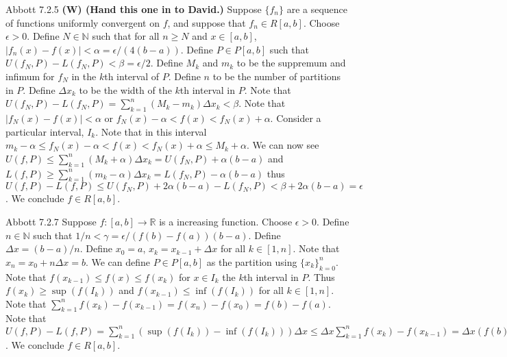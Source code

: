 \documentclass[12pt]{article}
\makeatletter
\theoremstyle{homework}
\newenvironment{exercise}[1]
{\def\@currentlabel{#1}\exercisecore}
{\endexercisecore}
\newcommand\W{{\color{red}\textbf{(W) (Hand this one in to David.)}}}
\makeatother
\begin{document}
\begin{exercise}
1
Abbott 7.2.5 \W
\end{exercise}
Suppose $\{f_n\}$ are a sequence of functions uniformly convergent on $f$, and suppose that $f_n\in R[a,b]$.  Choose $\epsilon>0$.  Define $N\in\mathbb{N}$ such that for all $n\geq N$ and $x\in[a,b]$, $|f_n(x)-f(x)|<\alpha=\epsilon/(4(b-a))$.  Define $P\in P[a,b]$ such that $U(f_N,P)-L(f_N,P)<\beta=\epsilon/2$.  Define $M_k$ and $m_k$ to be the suppremum and infimum for $f_N$ in the $k$th interval of $P$.  Define $n$ to be the number of partitions in $P$.  Define $\Delta x_k$ to be the width of the $k$th interval in $P$.  Note that $U(f_N,P)-L(f_N,P)=\sum^n_{k=1} (M_k-m_k)\Delta x_k<\beta$.  Note that $|f_N(x)-f(x)|<\alpha$ or $f_N(x)-\alpha<f(x)<f_N(x)+\alpha$.  Consider a particular interval, $I_k$.  Note that in this interval $m_k-\alpha\leq f_N(x)-\alpha<f(x)<f_N(x)+\alpha \leq M_k+\alpha$.  We can now see $U(f,P)\leq \sum^n_{k=1} (M_k+\alpha) \Delta x_k=U(f_N,P)+ \alpha(b-a)$ and $L(f,P)\geq \sum^n_{k=1} (m_k-\alpha) \Delta x_k=L(f_N,P)- \alpha(b-a)$ thus $U(f,P)-L(f,P)\leq U(f_N,P)+ 2\alpha(b-a) -L(f_N,P)<\beta+2\alpha(b-a)=\epsilon$.  We conclude $f\in R[a,b]$.


\newpage
\begin{exercise}
2
Abbott 7.2.7
\end{exercise}
Suppose $f:[a,b]\rightarrow\mathbb{R}$ is a increasing function.  Choose $\epsilon>0$.  Define $n\in\mathbb{N}$ such that $1/n<\gamma=\epsilon/(f(b)-f(a))(b-a)$.  Define $\Delta x=(b-a)/n$.  Define $x_0=a$, $x_k=x_{k-1}+\Delta x$ for all $k\in [1,n]$.  Note that $x_n=x_0+n\Delta x=b$.  We can define $P\in P[a,b]$ as the partition using $\{x_k \}_{k=0}^n$.  Note that $f(x_{k-1}) \leq f(x)\leq f(x_k)$ for $x\in I_k$ the $k$th interval in $P$.  Thus $f(x_k)\geq \sup(f(I_k))$ and $f(x_{k-1})\leq \inf(f(I_k))$ for all $k\in [1,n]$.  Note that $\sum_{k=1}^n f(x_k)-f(x_{k-1})=f(x_n)-f(x_0)=f(b)-f(a)$.  Note that $U(f,P)-L(f,P)= \sum_{k=1}^n(\sup(f(I_k))-\inf(f(I_k)))\Delta x\leq \Delta x\sum_{k=1}^n f(x_k)-f(x_{k-1})=\Delta x (f(b)-f(a))=(f(b)-f(a))(b-a)/n<(f(b)-f(a))(b-a)\gamma=\epsilon$.  We conclude $f\in R[a,b]$.
\end{document}
